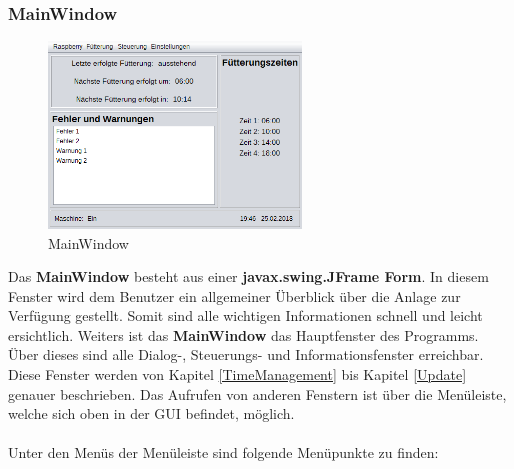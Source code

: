 \subsubsection{MainWindow}\label{subsubsec:MainWindow}
\begin{figure}
\vspace{-20pt}
  \begin{center}
    \includegraphics[width=0.60\textwidth]{Bilder/GUI/MainWindow}
  \end{center}
  \caption{MainWindow}
  \label{MainWindow}
  \vspace{20pt}
\end{figure}
Das \textbf{MainWindow} besteht aus einer \textbf{javax.swing.JFrame Form}. In diesem Fenster wird dem Benutzer ein allgemeiner Überblick über die Anlage zur Verfügung gestellt. Somit sind alle wichtigen Informationen schnell und leicht ersichtlich. Weiters ist das \textbf{MainWindow} das Hauptfenster des Programms. Über dieses sind alle Dialog-, Steuerungs- und Informationsfenster erreichbar. Diese Fenster werden von Kapitel \ref{TimeManagement} bis Kapitel \ref{Update} genauer beschrieben. Das Aufrufen von anderen Fenstern ist über die Menüleiste, welche sich oben in der \ac{GUI} befindet, möglich. 
\\ \\ Unter den Menüs der Menüleiste sind folgende Menüpunkte zu finden:
